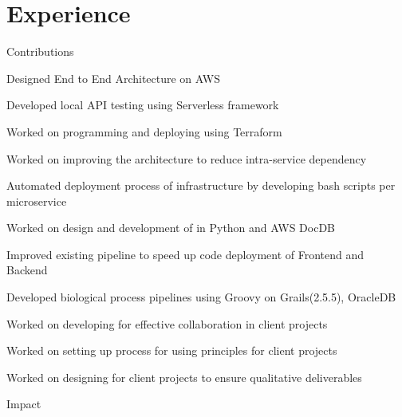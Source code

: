 \documentclass[]{single-page-resume}
\begin{document}
\begin{minipage}[t]{0.66\textwidth} 


\section{Experience}

Contributions
\vspace{\topsep} %
\begin{tightemize}
\item Designed End to End   Architecture on AWS
\item Developed local API testing using Serverless framework
\item Worked on programming and deploying  using Terraform
\item Worked on improving the  architecture to reduce intra-service dependency
\item Automated deployment process of infrastructure by developing bash scripts per microservice
\item Worked on design and development of   in Python and AWS DocDB
\item Improved existing  pipeline to speed up code deployment of Frontend and Backend
\item Developed biological process pipelines using Groovy on Grails(2.5.5), OracleDB
\item Worked on developing  for effective collaboration in client projects
\item Worked on setting up process for  using  principles for client projects
\item Worked on designing  for client projects to ensure qualitative deliverables
\end{tightemize}
Impact

\end{minipage}
\end{document}
